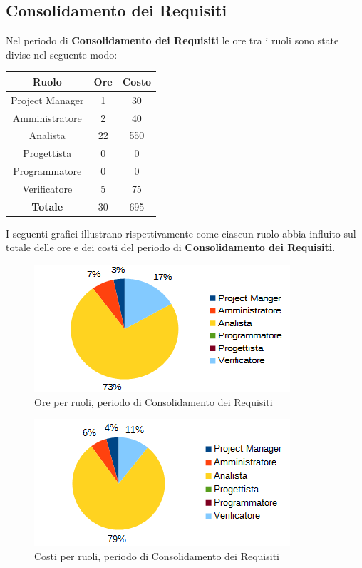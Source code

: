 	\subsection{Consolidamento dei Requisiti}
	Nel periodo di \textbf{Consolidamento dei Requisiti} le ore tra i ruoli sono state divise nel seguente modo: \\
	\begin{table}[H]
		\centering
		\begin{tabular}{|c|c|c|}
			\hline
			\textbf{Ruolo}		& \textbf{Ore}	& \textbf{Costo} \\
			\hline
			Project Manager		& 1				& 30	\\
			Amministratore		& 2				& 40	\\
			Analista			& 22			& 550	\\
			Progettista			& 0				& 0	\\
			Programmatore		& 0				& 0	\\
			Verificatore		& 5				& 75	\\
			\hline
			\textbf{Totale}		& 30			& 695	\\
			\hline
		\end{tabular}
		\end{table}
	I seguenti grafici illustrano rispettivamente come ciascun ruolo abbia influito sul totale
delle ore e dei costi del periodo di \textbf{Consolidamento dei Requisiti}. \\
	\begin{figure}[H]
		\centering
		\includegraphics[width=1\linewidth]{immagini/grafici/analisi_dettaglio-torta.png}
		\caption{Ore per ruoli, periodo di Consolidamento dei Requisiti}
	\end{figure}
	\begin{figure}[H]
		\centering
		\includegraphics[width=1\linewidth]{immagini/grafici/analisi_dettaglio-torta-costo.png}
		\caption{Costi per ruoli, periodo di Consolidamento dei Requisiti}
	\end{figure}
